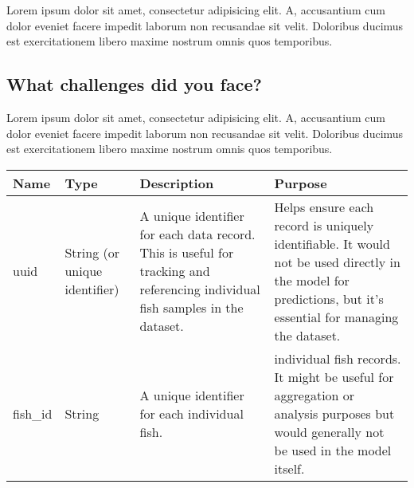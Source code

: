 Lorem ipsum dolor sit amet, consectetur adipisicing elit. A, accusantium cum dolor eveniet facere impedit laborum non recusandae sit velit. Doloribus ducimus est exercitationem libero maxime nostrum omnis quos temporibus.


\subsection{What challenges did you face?}

Lorem ipsum dolor sit amet, consectetur adipisicing elit. A, accusantium cum dolor eveniet facere impedit laborum non recusandae sit velit. Doloribus ducimus est exercitationem libero maxime nostrum omnis quos temporibus.



\usepackage{array}

\begin{center}
\begin{tabular}{| m{2cm} | m{2cm}| m{2cm} | m{2cm} |}
Name & Type & Description & Purpose                                                                                                                                                     &  \\
 \hline
 \hline
uuid & String (or unique identifier) & A unique identifier for each data record. This is useful for tracking and referencing individual fish samples in the dataset. & Helps ensure each record is uniquely identifiable. It would not be used directly in the model for predictions, but it's essential for managing the dataset. &  \\
 \hline
fish\_id & String & A unique identifier for each individual fish. & individual fish records. It might be useful for aggregation or analysis purposes but would generally not be used in the model itself. &   \\
 \hline
\end{tabular}
\end{center}


